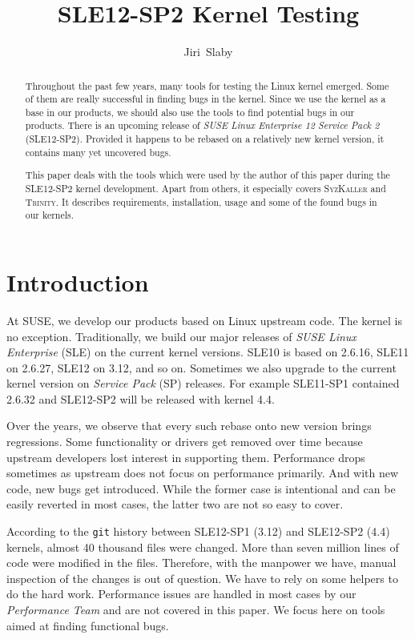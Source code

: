 \documentclass[10pt]{llncs}
\newcommand{\syz}{\textsc{SyzKaller}\xspace}
\newcommand{\trin}{\textsc{Trinity}\xspace}
\begin{document}
\title{SLE12-SP2 Kernel Testing}
\author{Jiri~Slaby}

\maketitle

\begin{abstract}
  Throughout the past few years, many tools for testing the Linux kernel
  emerged. Some of them are really successful in finding bugs in the kernel.
  Since we use the kernel as a base in our products, we should also use the
  tools to find potential bugs in our products. There is an upcoming release
  of \textit{SUSE Linux Enterprise 12 Service Pack 2} (SLE12-SP2). Provided
  it happens to be rebased on a relatively new kernel version, it contains
  many yet uncovered bugs.

  This paper deals with the tools which were used by the author of this paper
  during the SLE12-SP2 kernel development. Apart from others, it especially
  covers \syz and \trin. It describes requirements, installation, usage and
  some of the found bugs in our kernels.
\end{abstract}

\section{Introduction} \label{sec:intro}
At SUSE, we develop our products based on Linux upstream code. The kernel is
no exception. Traditionally, we build our major releases of \textit{SUSE Linux
Enterprise} (SLE) on the current kernel versions. SLE10 is based on 2.6.16,
SLE11 on 2.6.27, SLE12 on 3.12, and so on. Sometimes we also upgrade to the
current kernel version on \textit{Service Pack} (SP) releases. For example
SLE11-SP1 contained 2.6.32 and SLE12-SP2 will be released with kernel 4.4.

Over the years, we observe that every such rebase onto new version brings
regressions. Some functionality or drivers get removed over time because
upstream developers lost interest in supporting them. Performance drops
sometimes as upstream does not focus on performance primarily. And with new
code, new bugs get introduced. While the former case is intentional and can be
easily reverted in most cases, the latter two are not so easy to cover.

According to the \texttt{git} history between SLE12-SP1 (3.12) and SLE12-SP2
(4.4) kernels, almost 40 thousand files were changed. More than seven million
lines of code were modified in the files.
Therefore, with the manpower we have, manual inspection of the changes is out
of question. We have to rely on some helpers to do the hard work. Performance
issues are handled in most cases by our \textit{Performance Team} and are not
covered in this paper. We focus here on tools aimed at finding functional
bugs.
\end{document}
